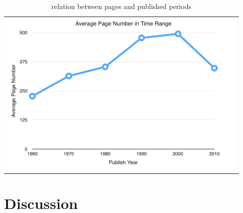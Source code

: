 \documentclass[10pt, oneside]{article}
\begin{document}
\begin{table}[H]
\centering
\begin{tabular}{c}
\includegraphics[width=12cm, height=8cm]{average}
\end{tabular}
\caption{relation between pages and published periods}
\end{table}

\section*{Discussion}
\end{document}
